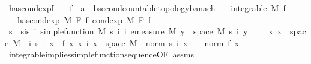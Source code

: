 \begin{isabellebody}
\isamarkupfalse%
%
\endisatagproof
{\isafoldproof}%
%
\isadelimproof
\isanewline
%
\endisadelimproof
\isanewline
{}\isamarkupfalse%
\ has{\isacharunderscore}{\kern0pt}cond{\isacharunderscore}{\kern0pt}expI{\isacharcolon}{\kern0pt}\isanewline
\ \ \ f\ {\isacharcolon}{\kern0pt}{\isacharcolon}{\kern0pt}\ {\isachardoublequoteopen}{\isacharprime}{\kern0pt}a\ {\isasymRightarrow}\ {\isacharprime}{\kern0pt}b{\isacharcolon}{\kern0pt}{\isacharcolon}{\kern0pt}{\isacharbraceleft}{\kern0pt}second{\isacharunderscore}{\kern0pt}countable{\isacharunderscore}{\kern0pt}topology{\isacharcomma}{\kern0pt}banach{\isacharbraceright}{\kern0pt}{\isachardoublequoteclose}\isanewline
\ \ \ {\isachardoublequoteopen}integrable\ M\ f{\isachardoublequoteclose}\isanewline
\ \ \ {\isachardoublequoteopen}has{\isacharunderscore}{\kern0pt}cond{\isacharunderscore}{\kern0pt}exp\ M\ F\ f\ {\isacharparenleft}{\kern0pt}cond{\isacharunderscore}{\kern0pt}exp\ M\ F\ f{\isacharparenright}{\kern0pt}{\isachardoublequoteclose}\isanewline
%
\isadelimproof
%
\endisadelimproof
%
\isatagproof
{}\isamarkupfalse%
\ {\isacharminus}{\kern0pt}\isanewline
\ \ \isamarkupfalse%
\ s\ \ s{\isacharunderscore}{\kern0pt}is{\isacharcolon}{\kern0pt}\ {\isachardoublequoteopen}{\isasymAnd}i{\isachardot}{\kern0pt}\ simple{\isacharunderscore}{\kern0pt}function\ M\ {\isacharparenleft}{\kern0pt}s\ i{\isacharparenright}{\kern0pt}{\isachardoublequoteclose}\ {\isachardoublequoteopen}{\isasymAnd}i{\isachardot}{\kern0pt}\ emeasure\ M\ {\isacharbraceleft}{\kern0pt}y\ {\isasymin}\ space\ M{\isachardot}{\kern0pt}\ s\ i\ y\ {\isasymnoteq}\ {}{\isacharbraceright}{\kern0pt}\ {\isasymnoteq}\ {\isasyminfinity}{\isachardoublequoteclose}\ {\isachardoublequoteopen}{\isasymAnd}x{\isachardot}{\kern0pt}\ x\ {\isasymin}\ space\ M\ {\isasymLongrightarrow}\ {\isacharparenleft}{\kern0pt}{\isasymlambda}i{\isachardot}{\kern0pt}\ s\ i\ x{\isacharparenright}{\kern0pt}\ {\isasymlonglonglongrightarrow}\ f\ x{\isachardoublequoteclose}\ {\isachardoublequoteopen}{\isasymAnd}x\ i{\isachardot}{\kern0pt}\ x\ {\isasymin}\ space\ M\ {\isasymLongrightarrow}\ norm\ {\isacharparenleft}{\kern0pt}s\ i\ x{\isacharparenright}{\kern0pt}\ {\isasymle}\ {}\ {\isacharasterisk}{\kern0pt}\ norm\ {\isacharparenleft}{\kern0pt}f\ x{\isacharparenright}{\kern0pt}{\isachardoublequoteclose}\ \isamarkupfalse%
\ integrable{\isacharunderscore}{\kern0pt}implies{\isacharunderscore}{\kern0pt}simple{\isacharunderscore}{\kern0pt}function{\isacharunderscore}{\kern0pt}sequence{\isacharbrackleft}{\kern0pt}OF\ assms{\isacharbrackright}{\kern0pt}\ \isamarkupfalse%

\end{isabellebody}
